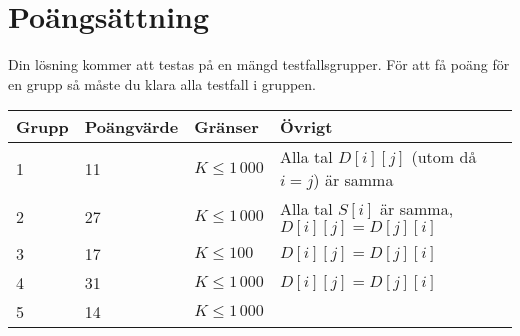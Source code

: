 \section*{Poängsättning}
Din lösning kommer att testas på en mängd testfallsgrupper. För att få poäng för en grupp
så måste du klara alla testfall i gruppen.
\begin{tabular}{| l | l | l | l |}
\hline
Grupp & Poängvärde & Gränser & Övrigt \\ \hline
	1     & 11         & $K \le 1\,000$ & Alla tal $D[i][j]$ (utom då $i = j$) är samma \\ \hline
	2     & 27         & $K \le 1\,000$ & Alla tal $S[i]$ är samma, $D[i][j] = D[j][i]$\\ \hline
	3     & 17         & $K \le 100$ & $D[i][j] = D[j][i]$ \\ \hline
	4     & 31         & $K \le 1\,000$ & $D[i][j] = D[j][i]$ \\ \hline
	5     & 14         & $K \le 1\,000$ & \\ \hline
\end{tabular}
